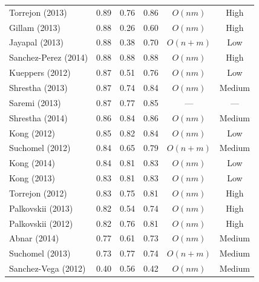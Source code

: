 \begin{table}[th]
\begin{tabular}{@{}l*{3}{c}cc@{}}
      Torrejon (2013)   &       0.89            &    0.76       &  0.86             & $O(nm)$       & High              \\ %
        Gillam (2013)   &       0.88            &    0.26       &  0.60             & $O(nm)$       & High              \\ %
       Jayapal (2013)   &       0.88            &    0.38       &  0.70             & $O(n+m)$      & Low               \\
 Sanchez-Perez (2014)   &       0.88            &    0.88       &  0.88             & $O(nm)$       & High              \\
      Kueppers (2012)   &       0.87            &    0.51       &  0.76             & $O(nm)$       & Low               \\
      Shrestha (2013)   &       0.87            &    0.74       &  0.84             & $O(nm)$       & Medium            \\
        Saremi (2013)   &       0.87            &    0.77       &  0.85             & ---           & ---               \\
      Shrestha (2014)   &       0.86            &    0.84       &  0.86             & $O(nm)$       & Medium            \\
          Kong (2012)   &       0.85            &    0.82       &  0.84             & $O(nm)$       & Low               \\
      Suchomel (2012)   &       0.84            &    0.65       &  0.79             & $O(n+m)$      & Medium            \\
          Kong (2014)   &       0.84            &    0.81       &  0.83             & $O(nm)$       & Low               \\
          Kong (2013)   &       0.83            &    0.81       &  0.83             & $O(nm)$       & Low               \\
      Torrejon (2012)   &       0.83            &    0.75       &  0.81             & $O(nm)$       & High              \\ %
    Palkovskii (2013)   &       0.82            &    0.54       &  0.74             & $O(nm)$       & High              \\
    Palkovskii (2012)   &       0.82            &    0.76       &  0.81             & $O(nm)$       & High              \\
         Abnar (2014)   &       0.77            &    0.61       &  0.73             & $O(nm)$       & Medium            \\
      Suchomel (2013)   &       0.73            &    0.77       &  0.74             & $O(n+m)$      & Medium            \\
  Sanchez-Vega (2012)   &       0.40            &    0.56       &  0.42             & $O(nm)$       & Medium            \\
\bottomrule
\end{tabular}

\end{table}

